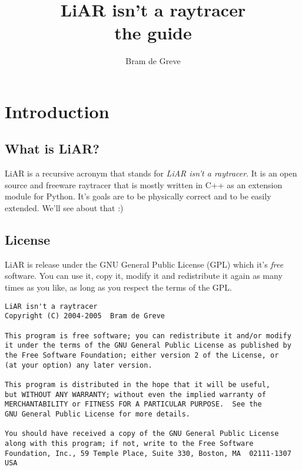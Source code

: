 \documentclass[10pt,a4paper,titlepage,english]{report}
\begin{document}
\title{LiAR isn't a raytracer\\the guide}
\author{Bram de Greve}



\maketitle

\tableofcontents

\chapter{Introduction}

\section{What is LiAR?}

LiAR is a recursive acronym that stands for \emph{LiAR isn't a raytracer}.  It is an open source and freeware raytracer that is mostly written in C++ as an extension module for Python.
It's goals are to be physically correct and to be easily extended.  We'll see about that :)


\section{License}

LiAR is release under the GNU General Public License (GPL) which it's \emph{free} software.  You can use it, copy it, modify it and redistribute it again as many times as you like, as long as you respect the terms of the GPL.

\begin{verbatim}
LiAR isn't a raytracer
Copyright (C) 2004-2005  Bram de Greve

This program is free software; you can redistribute it and/or modify
it under the terms of the GNU General Public License as published by
the Free Software Foundation; either version 2 of the License, or
(at your option) any later version.

This program is distributed in the hope that it will be useful,
but WITHOUT ANY WARRANTY; without even the implied warranty of
MERCHANTABILITY or FITNESS FOR A PARTICULAR PURPOSE.  See the
GNU General Public License for more details.

You should have received a copy of the GNU General Public License
along with this program; if not, write to the Free Software
Foundation, Inc., 59 Temple Place, Suite 330, Boston, MA  02111-1307  USA
\end{verbatim}
\end{document}

